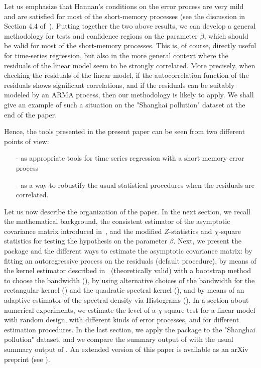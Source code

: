 Let us emphasize that Hannan's conditions on the error process are very mild and are satisfied for most of the short-memory processes (see the discussion in Section $4.4$ of~\cite{caron2018}). Putting together the two above results, we can develop a general methodology for tests and confidence regions on the parameter $\beta$, which should be valid for most of the short-memory processes. This is, of course, directly useful for time-series regression,
but also in the more general context where the residuals of the linear model seem to be strongly correlated. More precisely, when checking the residuals of the linear model, if the autocorrelation function of the residuals shows significant correlations, and if the residuals can be suitably modeled by an ARMA process, then our methodology is likely to apply. We shall give an example of such a situation on the "Shanghai pollution" dataset at the end of the paper.

\smallskip
Hence, the tools presented in the present paper can be seen from two different points of view:
\begin{itemize}
\item[-] as appropriate tools for time series regression with a short memory error process
\item[-] as a way to robustify the usual statistical procedures when the residuals are correlated.
\end{itemize}
\smallskip

Let us now describe the organization of the paper. In the next section, we recall the mathematical background, the consistent estimator of the asymptotic covariance matrix introduced in~\cite{caron2019}, and the modified $Z$-statistics and $\chi$-square statistics for testing the hypothesis on the parameter $\beta$.
Next, we present the  package and the different ways to estimate the asymptotic covariance matrix: by fitting an autoregressive process on the residuals (default procedure), by means of the kernel estimator described in~\cite{caron2019}  (theoretically valid) with a bootstrap method to choose the bandwidth (\cite{wu2009banding}), by using alternative choices of the bandwidth for the rectangular kernel (\cite{efromovich1998data}) and the quadratic spectral kernel (\cite{andrews1991heteroskedasticity}), and by means of an adaptive estimator of the spectral density via Histograms (\cite{comte2001adaptive}). In a section about numerical experiments, we estimate the level of a $\chi$-square test for a linear model with random design, with different kinds of error processes, and for different estimation procedures. In the last section,  we apply the package to the "Shanghai pollution" dataset, and we compare the summary output of  with the usual summary output of .
An extended version of this paper is available as an arXiv preprint (see \cite{caron2019linear}).

